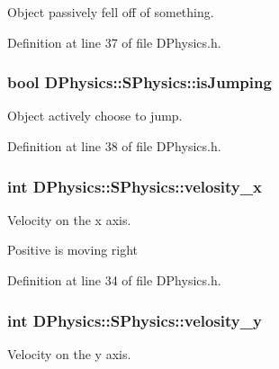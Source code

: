 Object passively fell off of something. 



Definition at line 37 of file D\-Physics.\-h.

\hypertarget{structDPhysics_1_1SPhysics_a6fc3e1a46d84fb6dec9f198bb6513856}{
\subsubsection[{is\-Jumping}]{\setlength{\rightskip}{0pt plus 5cm}bool D\-Physics\-::\-S\-Physics\-::is\-Jumping}}\label{structDPhysics_1_1SPhysics_a6fc3e1a46d84fb6dec9f198bb6513856}


Object actively choose to jump. 



Definition at line 38 of file D\-Physics.\-h.

\hypertarget{structDPhysics_1_1SPhysics_a2654e1fd65ea35fe4119c7866fd46274}{
\subsubsection[{velosity\-\_\-x}]{\setlength{\rightskip}{0pt plus 5cm}int D\-Physics\-::\-S\-Physics\-::velosity\-\_\-x}}\label{structDPhysics_1_1SPhysics_a2654e1fd65ea35fe4119c7866fd46274}


Velocity on the x axis. 

Positive is moving right 

Definition at line 34 of file D\-Physics.\-h.

\hypertarget{structDPhysics_1_1SPhysics_a58c1f8fa61d0aeece450d7ab789c5013}{
\subsubsection[{velosity\-\_\-y}]{\setlength{\rightskip}{0pt plus 5cm}int D\-Physics\-::\-S\-Physics\-::velosity\-\_\-y}}\label{structDPhysics_1_1SPhysics_a58c1f8fa61d0aeece450d7ab789c5013}


Velocity on the y axis. 

